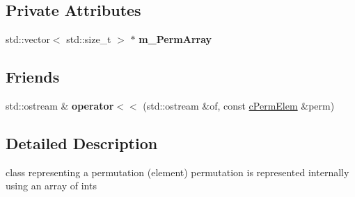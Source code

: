 \subsection*{Private Attributes}
\begin{DoxyCompactItemize}
\item 
\hypertarget{classcPermElem_a60fc59bfe827b07c6567a3b7a5a25726}{std\-::vector$<$ std\-::size\-\_\-t $>$ $\ast$ {\bfseries m\-\_\-\-Perm\-Array}}\label{classcPermElem_a60fc59bfe827b07c6567a3b7a5a25726}

\end{DoxyCompactItemize}
\subsection*{Friends}
\begin{DoxyCompactItemize}
\item 
\hypertarget{classcPermElem_a4211aa547f8e3f2dc6b44ad07f7224db}{std\-::ostream \& {\bfseries operator$<$$<$} (std\-::ostream \&of, const \hyperlink{classcPermElem}{c\-Perm\-Elem} \&perm)}\label{classcPermElem_a4211aa547f8e3f2dc6b44ad07f7224db}

\end{DoxyCompactItemize}


\subsection{Detailed Description}
class representing a permutation (element) permutation is represented internally using an array of ints 

